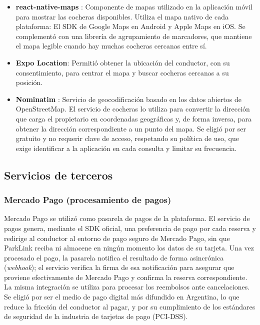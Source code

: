 \begin{itemize}
    \item \textbf{react-native-maps} \autocite{reactnativemaps}: Componente de mapas utilizado en la aplicación móvil para mostrar las cocheras disponibles. Utiliza el mapa nativo de cada plataforma: El SDK de Google Maps en Android y Apple Maps en iOS. Se complementó con una librería de agrupamiento de marcadores, que mantiene el mapa legible cuando hay muchas cocheras cercanas entre sí.
    \item \textbf{Expo Location}: Permitió obtener la ubicación del conductor, con su consentimiento, para centrar el mapa y buscar cocheras cercanas a su posición.
    \item \textbf{Nominatim} \autocite{nominatim}: Servicio de geocodificación basado en los datos abiertos de OpenStreetMap. El servicio de cocheras lo utiliza para convertir la dirección que carga el propietario en coordenadas geográficas y, de forma inversa, para obtener la dirección correspondiente a un punto del mapa. Se eligió por ser gratuito y no requerir clave de acceso, respetando su política de uso, que exige identificar a la aplicación en cada consulta y limitar su frecuencia.
\end{itemize}

\subsection{Servicios de terceros}

\subsubsection{Mercado Pago (procesamiento de pagos)}

Mercado Pago \autocite{mercadopago} se utilizó como pasarela de pagos de la plataforma. El servicio de pagos genera, mediante el SDK oficial, una preferencia de pago por cada reserva y redirige al conductor al entorno de pago seguro de Mercado Pago, sin que ParkLink reciba ni almacene en ningún momento los datos de su tarjeta. Una vez procesado el pago, la pasarela notifica el resultado de forma asincrónica (\textit{webhook}); el servicio verifica la firma de esa notificación para asegurar que proviene efectivamente de Mercado Pago y confirma la reserva correspondiente. La misma integración se utiliza para procesar los reembolsos ante cancelaciones. Se eligió por ser el medio de pago digital más difundido en Argentina, lo que reduce la fricción del conductor al pagar, y por su cumplimiento de los estándares de seguridad de la industria de tarjetas de pago (PCI-DSS).

